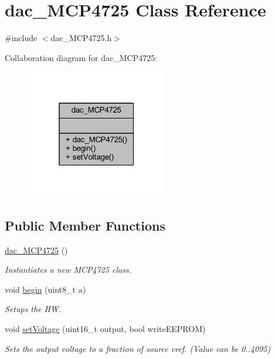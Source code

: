 \hypertarget{classdac___m_c_p4725}{}\section{dac\+\_\+\+M\+C\+P4725 Class Reference}
\label{classdac___m_c_p4725}


{\ttfamily \#include $<$dac\+\_\+\+M\+C\+P4725.\+h$>$}



Collaboration diagram for dac\+\_\+\+M\+C\+P4725\+:\nopagebreak
\begin{figure}[H]
\begin{center}
\leavevmode
\includegraphics[width=175pt]{classdac___m_c_p4725__coll__graph}
\end{center}
\end{figure}
\subsection*{Public Member Functions}
\begin{DoxyCompactItemize}
\item 
\hyperlink{classdac___m_c_p4725_a1963bacd207b3c9618485427a706bc86}{dac\+\_\+\+M\+C\+P4725} ()
\begin{DoxyCompactList}\small\item\em Instantiates a new M\+C\+P4725 class. \end{DoxyCompactList}\item 
void \hyperlink{classdac___m_c_p4725_ad2a4a3342f561821e76388ad3849a0a7}{begin} (uint8\+\_\+t a)
\begin{DoxyCompactList}\small\item\em Setups the HW. \end{DoxyCompactList}\item 
void \hyperlink{classdac___m_c_p4725_a93548cddb90bd4f58c4fc3b53516fd08}{set\+Voltage} (uint16\+\_\+t output, bool write\+E\+E\+P\+R\+OM)
\begin{DoxyCompactList}\small\item\em Sets the output voltage to a fraction of source vref. (Value can be 0..4095) \end{DoxyCompactList}\end{DoxyCompactItemize}


